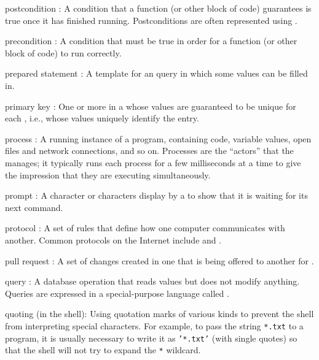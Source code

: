 \documentclass{book}
\begin{document}
\begin{swcdescription}
\item[postcondition]:
A condition that a function (or other block of
code) guarantees is true once it has finished running. Postconditions
are often represented using .

\item[precondition]:
A condition that must be true in order for a
function (or other block of code) to run correctly.

\item[prepared statement]:
A template for an 
query in which some values can be filled in.

\item[primary key]:
One or more  in
a  whose values are
guaranteed to be unique for each ,
i.e., whose values uniquely identify the entry.

\item[process]:
A running instance of a program, containing code,
variable values, open files and network connections, and so on.
Processes are the ``actors'' that the
 manages; it typically
runs each process for a few milliseconds at a time to give the
impression that they are executing simultaneously.

\item[prompt]:
A character or characters display by a
 to show that it is waiting for its next command.

\item[protocol]:
A set of rules that define how one computer communicates with another.
Common protocols on the Internet include  and .
 
\item[pull request]:
A set of changes created in one  
that is being offered to another for .

\item[query]:
A database operation that reads values but does not
modify anything. Queries are expressed in a special-purpose language
called .

\item[quoting] (in the shell):
Using quotation marks of various kinds
to prevent the shell from interpreting special characters. For example,
to pass the string \texttt{*.txt} to a program, it is usually necessary
to write it as \texttt{'*.txt'} (with single quotes) so that the shell
will not try to expand the \texttt{*} wildcard.
 

\end{swcdescription}
\end{document}
